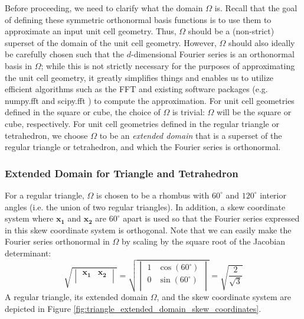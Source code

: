 \documentclass[acmtog]{acmart}
\begin{document}
Before proceeding, we need to clarify what the domain $\Omega$ is. Recall that the goal of defining these symmetric orthonormal basis functions is to use them to approximate an input unit cell geometry. Thus, $\Omega$ should be a (non-strict) superset of the domain of the unit cell geometry. However, $\Omega$ should also ideally be carefully chosen such that the $d$-dimensional Fourier series is an orthonormal basis in $\Omega$; while this is not strictly necessary for the purposes of approximating the unit cell geometry, it greatly simplifies things and enables us to utilize efficient algorithms such as the FFT and existing software packages (e.g. numpy.fft \cite{harris2020array} and scipy.fft \cite{virtanen2020scipy}) to compute the approximation. For unit cell geometries defined in the square or cube, the choice of $\Omega$ is trivial: $\Omega$ will be the square or cube, respectively. For unit cell geometries defined in the regular triangle or tetrahedron, we choose $\Omega$ to be an \textit{extended domain} that is a superset of the regular triangle or tetrahedron, and which the Fourier series is orthonormal.

\subsubsection{Extended Domain for Triangle and Tetrahedron}

For a regular triangle, $\Omega$ is chosen to be a rhombus with $60^\circ$ and $120^\circ$ interior angles (i.e. the union of two regular triangles). In addition, a skew coordinate system where $\mathbf{x_1}$ and $\mathbf{x_2}$ are $60^\circ$ apart is used so that the Fourier series expressed in this skew coordinate system is orthogonal. Note that we can easily make the Fourier series orthonormal in $\Omega$ by scaling by the square root of the Jacobian determinant:
\begin{equation}
  \sqrt{
    \begin{vmatrix}
      \mathbf{x_1} & \mathbf{x_2} \\
    \end{vmatrix}
  } = \sqrt{
    \begin{vmatrix}
      1 & \cos(60^{\circ}) \\
      0 & \sin(60^{\circ}) \\
    \end{vmatrix}
  } = \sqrt{\frac{2}{\sqrt{3}}}
\end{equation}
A regular triangle, its extended domain $\Omega$, and the skew coordinate system are depicted in Figure \ref{fig:triangle_extended_domain_skew_coordinates}.
\end{document}
